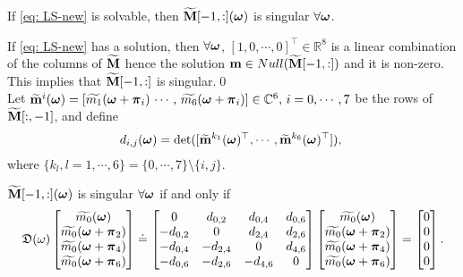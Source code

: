 \begin{lemma}\label{lem: subM-singular}
If \eqref{eq: LS-new} is solvable, then $\widetilde{\mathbf{M}}[-1,:](\boldsymbol{\omega})$ is singular $\forall \boldsymbol{\omega}$.
\end{lemma}
If \eqref{eq: LS-new} has a solution, then $\forall \boldsymbol{\omega}$,  $[1,0,\cdots,0]^\top\in \mathbb{R}^8$ is a linear combination of the columns of $\widetilde{\mathbf{M}}$ hence the solution $\mathbf{m} \in Null(\widetilde{\mathbf{M}}[-1,:])$ and it is non-zero. This implies that $\widetilde{\mathbf{M}}[-1,:]$ is singular.\qed\\[1em]
Let $\widetilde{\mathbf{m}}^{i}(\boldsymbol{\omega}) = [\widetilde{m_1}(\boldsymbol{\omega}+\boldsymbol{\pi}_i)\, \cdots,\,\widetilde{m_6}(\boldsymbol{\omega}+\boldsymbol{\pi}_i)]\in\mathbb{C}^6,\, i = 0,\cdots,7$ be the rows of $\widetilde{\mathbf{M}}[:,-1]$, and define $$d_{i,j}(\boldsymbol{\omega}) = \det([\widetilde{\mathbf{m}}^{k_1}(\boldsymbol{\omega})^\top,\cdots,\widetilde{\mathbf{m}}^{k_6}(\boldsymbol{\omega})^\top]),\;$$ where $\{k_l, l = 1,\cdots, 6\} = \{0,\cdots, 7\}\setminus \{i,j\}.$
\begin{lemma}\label{lem: subM-singular-sys}
$\widetilde{\mathbf{M}}[-1,:](\boldsymbol{\omega})$ is singular $\forall \boldsymbol{\omega}$ if and only if \vspace{.5em}
\begin{align}
\label{eq: singular-cond}
\mathfrak{D}(\omega)\begin{bmatrix}
\widetilde{m_{0}}(\boldsymbol{\omega})\\
\widetilde{m_{0}}(\boldsymbol{\omega}+\boldsymbol{\pi}_{2})\\
\widetilde{m_{0}}(\boldsymbol{\omega}+\boldsymbol{\pi}_{4})\\
\widetilde{m_{0}}(\boldsymbol{\omega}+\boldsymbol{\pi}_{6})
\end{bmatrix}
\doteq
\begin{bmatrix}
0 & d_{0,2} & d_{0,4} & d_{0,6}\\
-d_{0,2} & 0 & d_{2,4} & d_{2,6}\\
-d_{0,4} & -d_{2,4} & 0 & d_{4,6}\\
-d_{0,6} & -d_{2,6} & -d_{4,6} & 0
\end{bmatrix}
\begin{bmatrix}
\widetilde{m_{0}}(\boldsymbol{\omega})\\
\widetilde{m_{0}}(\boldsymbol{\omega}+\boldsymbol{\pi}_{2})\\
\widetilde{m_{0}}(\boldsymbol{\omega}+\boldsymbol{\pi}_{4})\\
\widetilde{m_{0}}(\boldsymbol{\omega}+\boldsymbol{\pi}_{6})
\end{bmatrix}
= \begin{bmatrix}
0\\0\\0\\0
\end{bmatrix}.
\end{align}
\end{lemma}
